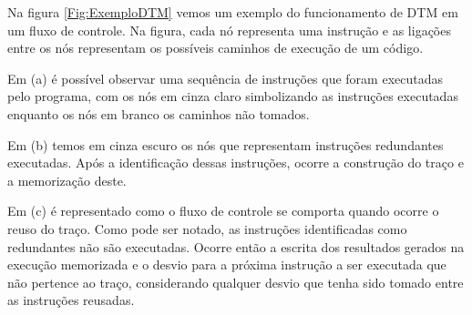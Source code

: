 Na figura \ref{Fig:ExemploDTM} vemos um exemplo do funcionamento de DTM em um fluxo de controle. Na figura, cada nó representa uma instrução e as ligações entre os nós representam os possíveis caminhos de execução de um código. 

Em (a) é possível observar uma sequência de instruções que foram executadas pelo programa, com os nós em cinza claro simbolizando as instruções executadas enquanto os nós em branco os caminhos não tomados.

Em (b) temos em cinza escuro os nós que representam instruções redundantes executadas. Após a identificação dessas instruções, ocorre a construção do traço e a memorização deste.

Em (c) é representado como o fluxo de controle se comporta quando ocorre o reuso do traço. Como pode ser notado, as instruções identificadas como redundantes não são executadas. Ocorre então a escrita dos resultados gerados na execução memorizada e o desvio para a próxima instrução a ser executada que não pertence ao traço, considerando qualquer desvio que tenha sido tomado entre as instruções reusadas.

